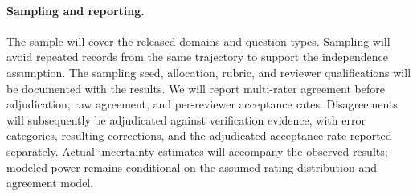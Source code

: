 \paragraph{Sampling and reporting.}
The sample will cover the released domains and question types. Sampling will
avoid repeated records from the same trajectory to support the independence
assumption. The sampling seed, allocation, rubric, and reviewer qualifications
will be documented with the results. We will report multi-rater agreement
before adjudication, raw agreement, and per-reviewer acceptance rates.
Disagreements will subsequently be adjudicated against verification evidence,
with error categories, resulting corrections, and the adjudicated acceptance
rate reported separately. Actual uncertainty estimates will accompany the
observed results; modeled power remains conditional on the assumed rating
distribution and agreement model.
